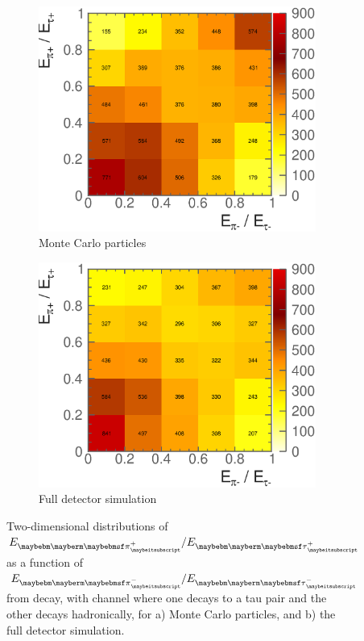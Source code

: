 \begin{figure}[htbp]
\centering %
\begin{subfigure}[b]{0.75\textwidth}
  \includegraphics[width=\textwidth]{tau/NoTimeAnalysis/2DMC}
  \caption{Monte Carlo particles}
  \label{fig:TauSpin2DMC}
\end{subfigure}
\begin{subfigure}[b]{0.75\textwidth}
  \includegraphics[width=\textwidth]{tau/NoTimeAnalysis/2Dreco}
  \caption{Full detector simulation}
  \label{fig:TauSpin2Dreco}
\end{subfigure}
\caption
{Two-dimensional distributions of $E_{\Ppiplus}/E_{\APtauon}$ as a function of $E_{\Ppiminus}/E_{\Ptauon}$ from \ZToTauTau decay, with \eeZZ channel where one \PZ decays to a tau pair and the other \PZ decays hadronically,  for a) Monte Carlo particles, and b) the full detector simulation.}
\label{fig:TauSpin2D}
\end{figure}
